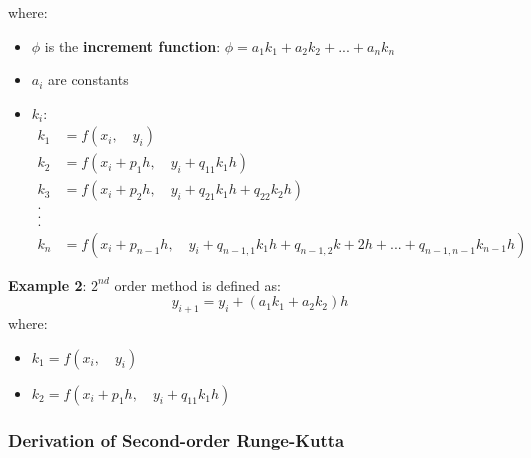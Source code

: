 \documentclass[10pt,a4paper]{article}
\begin{document}
where:
\begin{itemize}
    \item $\phi$ is the \textbf{increment function}: $\phi = a_1k_1+a_2k_2+...+a_nk_n$ 
    \item $a_i$ are constants
    \item $k_i$:
    \begin{equation*}
        \begin{aligned}
            k_1 &= f(x_i, \quad y_i) \\
            k_2 &= f(x_i+p_1h, \quad y_i+q_{11}k_1h) \\
            k_3 &= f(x_i + p_2h, \quad y_i + q_{21}k_1h + q_{22}k_2h)\\
            . \\
            . \\
            . \\
            k_n &= f(x_i + p_{n-1}h, \quad y_i + q_{n-1,1}k_1h + q_{n-1,2}k + 2h + ...+q_{n-1,n-1}k_{n-1}h)
        \end{aligned}
    \end{equation*}
\end{itemize}

\textbf{Example 2}: $2^{nd}$ order method is defined as:
$$
    y_{i+1}=y_i + (a_1k_1+a_2k_2)h
$$
where: 
\begin{itemize}
    \item $k_1 = f(x_i, \quad y_i)$
    \item $k_2 = f(x_i+p_1h, \quad y_i + q_{11}k_1h)$
\end{itemize}

\subsubsection{Derivation of Second-order Runge-Kutta}
\end{document}
